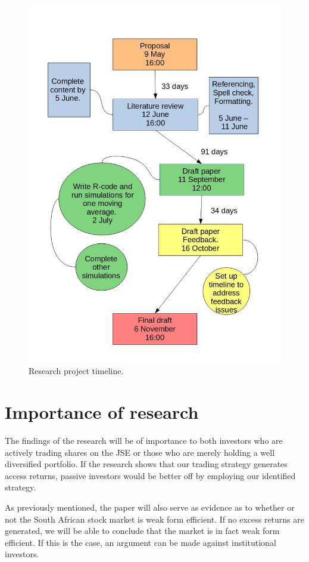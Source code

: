 \documentclass[12pt]{article}
\begin{document}
\begin{figure}
  \caption{Research project timeline.}
  \centering
    \includegraphics[width=1\textwidth]{timeline_final}
\end{figure}


\section{Importance of research}
The findings of the research will be of importance to both investors who are actively trading shares on the JSE or those who are merely holding a well diversified portfolio. If the research shows that our trading strategy generates access returns, passive investors would be better off by employing our identified strategy. 

As previously mentioned, the paper will also serve as evidence as to whether or not the South African stock market is weak form efficient. If no excess returns are generated, we will be able to conclude that the market is in fact weak form efficient. If this is the case, an argument can be made against institutional investors.  
\end{document}
